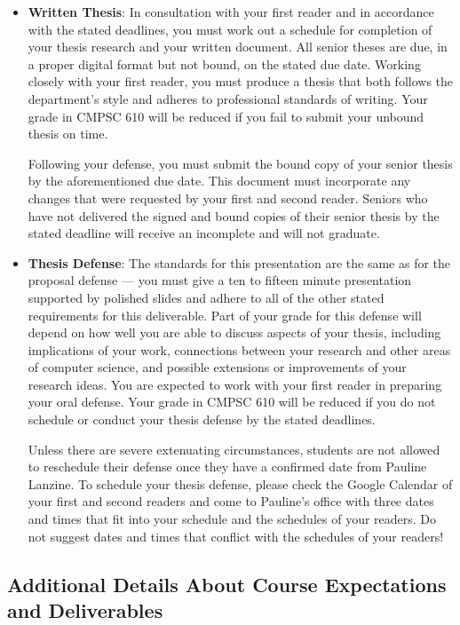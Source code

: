 \documentclass[11pt]{article}
\begin{document}
\begin{itemize}
  \item {\bf Written Thesis}: In consultation with your first reader and in
    accordance with the stated deadlines, you must work out a schedule for
    completion of your thesis research and your written document. All senior
    theses are due, in a proper digital format but not bound, on the stated due
    date. Working closely with your first reader, you must produce a thesis
    that both follows the department's style and adheres to professional
    standards of writing. Your grade in CMPSC 610 will be reduced if you fail
    to submit your unbound thesis on time.

    Following your defense, you must submit the bound copy of your senior
    thesis by the aforementioned due date.  This document must incorporate any
    changes that were requested by your first and second reader. Seniors who
    have not delivered the signed and bound copies of their senior thesis by
    the stated deadline will receive an incomplete and will not graduate.

  \item{\bf Thesis Defense}: The standards for this presentation are the same
    as for the proposal defense --- you must give a ten to fifteen minute
    presentation supported by polished slides and adhere to all of the other
    stated requirements for this deliverable. Part of your grade for this
    defense will depend on how well you are able to discuss aspects of your
    thesis, including implications of your work, connections between your
    research and other areas of computer science, and possible extensions or
    improvements of your research ideas. You are expected to work with your
    first reader in preparing your oral defense. Your grade in CMPSC 610 will
    be reduced if you do not schedule or conduct your thesis defense by the
    stated deadlines.

    Unless there are severe extenuating circumstances, students are not allowed
    to reschedule their defense once they have a confirmed date from Pauline
    Lanzine. To schedule your thesis defense, please check the Google Calendar
    of your first and second readers and come to Pauline's office with three
    dates and times that fit into your schedule and the schedules of your
    readers. Do not suggest dates and times that conflict with the schedules of
    your readers!

\end{itemize}

\subsection*{Additional Details About Course Expectations and Deliverables}
\end{document}
